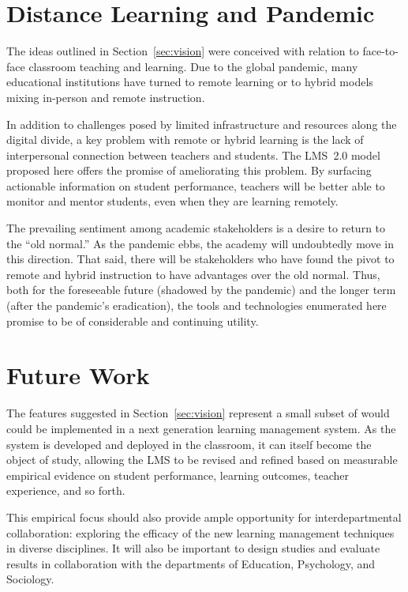 \documentclass{article}
\begin{document}
\section{Distance Learning and Pandemic}
\label{sec:pandemic}

The ideas outlined in Section~\ref{sec:vision}
were conceived with relation to
face-to-face classroom teaching and learning.
Due to the global pandemic,
many educational institutions
have turned to remote learning
or to hybrid models mixing in-person and remote instruction.

In addition to challenges posed by limited infrastructure
and resources along the digital divide,
a key problem with remote or hybrid learning
is the lack of interpersonal connection
between teachers and students.
The LMS~2.0 model proposed here
offers the promise of ameliorating
this problem.
By surfacing
actionable information on student performance,
teachers will be better able
to monitor and mentor students,
even when they are learning remotely.

The prevailing sentiment
among academic stakeholders
is a desire to return to the ``old normal.''
As the pandemic ebbs,
the academy will undoubtedly move
in this direction.
That said,
there will be stakeholders
who have found the
pivot to remote and hybrid instruction
to have advantages over the old normal.
Thus,
both for the foreseeable future
(shadowed by the pandemic)
and the longer term
(after the pandemic's eradication),
the tools and technologies
enumerated here
promise to be of
considerable and continuing
utility.

\section{Future Work}
\label{sec:future-work}

The features suggested in Section~\ref{sec:vision}
represent a small subset of would could be implemented
in a next generation learning management system.
As the system is developed and deployed in the classroom,
it can itself become the object of study,
allowing the LMS to be revised and refined
based on measurable empirical evidence
on student performance, learning outcomes, teacher experience, and so forth.

This empirical focus
should also provide ample opportunity for interdepartmental collaboration:
exploring the efficacy of the new learning management techniques
in diverse disciplines.
It will also be important to design studies
and evaluate results in collaboration
with the departments of Education, Psychology, and Sociology.
\end{document}
